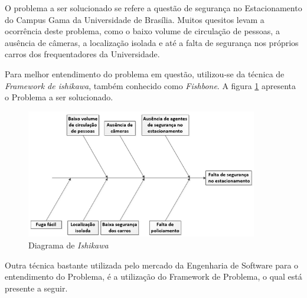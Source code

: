 	O problema a ser solucionado se refere a questão de segurança no Estacionamento do Campus Gama da Universidade de Brasília. Muitos quesitos levam a ocorrência deste problema, como o baixo volume de circulação de pessoas, a ausência de câmeras, a localização isolada e até a falta de segurança nos próprios carros dos frequentadores da Universidade.

	Para melhor entendimento do problema em questão, utilizou-se da técnica de \textit{Framework de ishikawa}, também conhecido como \textit{Fishbone}. A figura \ref{img:fishbone} apresenta o Problema a ser solucionado.

	\begin{figure}[H]
		\centering
		\includegraphics[width=0.9\textwidth]{figuras/fishbone}
		\caption{Diagrama de \textit{Ishikawa} }
		\label{img:fishbone}
	\end{figure}

	Outra técnica bastante utilizada pelo mercado da Engenharia de Software para o entendimento do Problema, é a utilização do Framework de Problema, o qual está presente a seguir.

